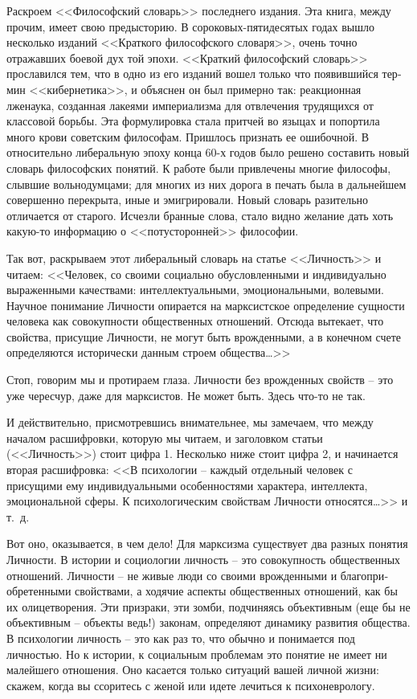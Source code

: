 \documentclass{book}
\begin{document}
Раскроем <<Философский словарь>> последнего издания.%
Эта книга, между прочим, имеет свою предысторию. В сороковых-пятидесятых 
годах вышло несколько из\-даний <<Крат\-ко\-го философского словаря>>, очень точно отражавших боевой дух той эпохи. <<Краткий философский 
словарь>> прославился тем, что в одно из его изданий вошел только что появившийся тер­мин <<кибернетика>>, и объяснен он был 
примерно так: реак­ционная лженаука, созданная лакеями империализма для отвле­чения трудящихся от классовой борьбы. Эта 
формулировка стала притчей во языцах и попортила много крови советским философам. Пришлось признать ее ошибочной. В относительно 
либеральную эпоху конца 60-х годов было решено составить новый словарь философских понятий. К работе были привлечены многие 
философы, слывшие вольнодумцами; для многих из них дорога в печать была в дальнейшем совершенно перекрыта, иные и эмигрировали. 
Новый словарь разительно отличается от старого. Исчезли бранные слова, стало видно же­лание дать хоть какую-то информацию о 
<<потусторонней>> философии.

Так вот, раскрываем этот либеральный словарь на статье <<Личность>> и читаем:
<<Человек, со своими социально обусловленными и индивидуально выраженными качествами: интеллектуальными, эмоциональными, 
волевыми. Научное понимание Личности опирается на марксистское определение сущности человека как со­вокупности общественных 
отношений. Отсюда вытекает, что свойства, присущие Личности, не могут быть врожденными, а в конечном счете определяются 
исторически данным строем общества\ldots>>

Стоп, говорим мы и протираем глаза. Личности без врож­денных свойств -- это уже чересчур, даже для марксистов. Не может быть. 
Здесь что-то не так.

И действительно, присмотревшись внимательнее, мы заме­чаем, что между началом расшифровки, которую мы читаем, и заголовком статьи 
(<<Личность>>) стоит цифра 1. Несколько ниже стоит цифра 2, и начинается вторая расшифровка:
<<В психологии -- каждый отдельный человек с присущими ему индивидуальными особенностями характера, интеллекта, эмоциональной 
сферы. К психологическим свойствам Лич­ности относятся\ldots>> и т.~д.

Вот оно, оказывается, в чем дело! Для марксизма сущест­вует два разных понятия Личности. В истории и социологии личность -- это 
совокупность общественных отношений. Лич­ности -- не живые люди со своими врожденными и благопри­обретенными свойствами, а ходячие 
аспекты общественных отношений, как бы их олицетворения. Эти призраки, эти зом­би, подчиняясь объективным (еще бы не объективным 
-- объек­ты ведь!) законам, определяют динамику развития общества. В психологии личность -- это как раз то, что обычно и 
понимает­ся под личностью. Но к истории, к социальным проблемам это понятие не имеет ни малейшего отношения. Оно касается только 
ситуаций вашей личной жизни: скажем, когда вы ссо­ритесь с женой или идете лечиться к психоневрологу.
\end{document}
